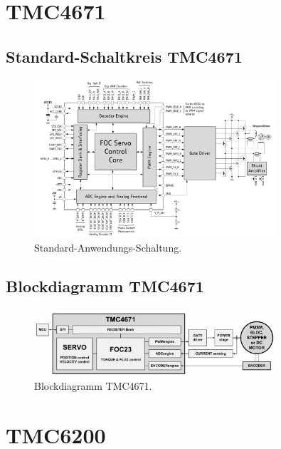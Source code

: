 \begin{appendix} 

\section{TMC4671}\label{Appendix:TMC4671}

\subsection{Standard-Schaltkreis TMC4671}

\begin{figure}[h!]
	\centering
	\includegraphics[width=0.8\textwidth]{graphics/Standard_Application_Cirquit_TMC4671}
	\caption{Standard-Anwendungs-Schaltung.}
	\label{fig:Schaltung_TMC4671}
\end{figure}

\subsection{Blockdiagramm TMC4671}

\begin{figure}[h!]
	\centering
	\includegraphics[width=0.8\textwidth]{graphics/Blockdiagramm_TMC4671}
	\caption{Blockdiagramm TMC4671.}
	\label{fig:Blockdiagramm_TMC4671}
\end{figure}

\newpage

\section{TMC6200}\label{Appendix:TMC6200}


\end{appendix}
